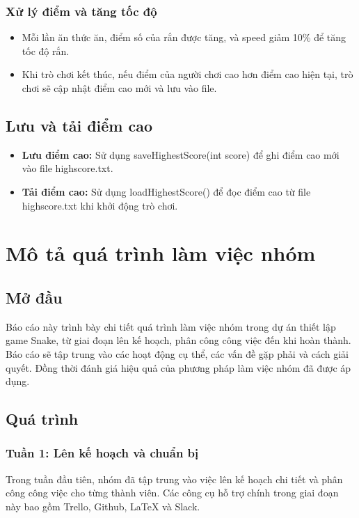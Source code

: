 \documentclass[a4paper,12pt]{article}
\begin{document}
\subsubsection{Xử lý điểm và tăng tốc độ}
\begin{itemize}
    \item Mỗi lần ăn thức ăn, điểm số của rắn được tăng, và speed giảm 10\% để tăng tốc độ rắn.
    \item Khi trò chơi kết thúc, nếu điểm của người chơi cao hơn điểm cao hiện tại, trò chơi sẽ cập nhật điểm cao mới và lưu vào file.
\end{itemize}

\subsection{Lưu và tải điểm cao}
\begin{itemize}
    \item \textbf{Lưu điểm cao:} Sử dụng saveHighestScore(int score) để ghi điểm cao mới vào file highscore.txt.
    \item \textbf{Tải điểm cao:} Sử dụng loadHighestScore() để đọc điểm cao từ file highscore.txt khi khởi động trò chơi.
\end{itemize}

\newpage
\section{Mô tả quá trình làm việc nhóm}
\subsection{Mở đầu}
Báo cáo này trình bày chi tiết quá trình làm việc nhóm trong dự án thiết lập game Snake, từ giai đoạn lên kế hoạch, phân công công việc đến khi hoàn thành. Báo cáo sẽ tập trung vào các hoạt động cụ thể, các vấn đề gặp phải và cách giải quyết. Đồng thời đánh giá hiệu quả của phương pháp làm việc nhóm đã được áp dụng.

\subsection{Quá trình}

\subsubsection*{Tuần 1: Lên kế hoạch và chuẩn bị}
Trong tuần đầu tiên, nhóm đã tập trung vào việc lên kế hoạch chi tiết và phân công công việc cho từng thành viên. Các công cụ hỗ trợ chính trong giai đoạn này bao gồm Trello, Github, LaTeX và Slack.
\end{document}
